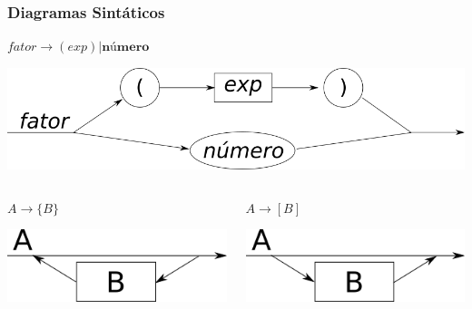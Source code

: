 \documentclass[table]{beamer}
\begin{document}
\begin{frame}
   \frametitle{Diagramas Sintáticos}
   \begin{center}
   $\textit{fator} \to (\textit{exp}) | \textbf{número}$
   \end{center}
   \includegraphics[width=\linewidth,height=\textheight,keepaspectratio]{figuras/diagrama_exp_numero.png}
   \begin{columns}
      \begin{column}{0.5\textwidth}
         \begin{center}
	    $A \to \{B\}$
	 \end{center}
         \includegraphics[width=\linewidth,height=\textheight,keepaspectratio]{figuras/diagrama_repeticao.png}
      \end{column}
      \begin{column}{0.5\textwidth}
         \begin{center}
	    $A \to [B]$
	 \end{center}
         \includegraphics[width=\linewidth,height=\textheight,keepaspectratio]{figuras/diagrama_opcional.png}
      \end{column}
   \end{columns}
\end{frame}
\end{document}
